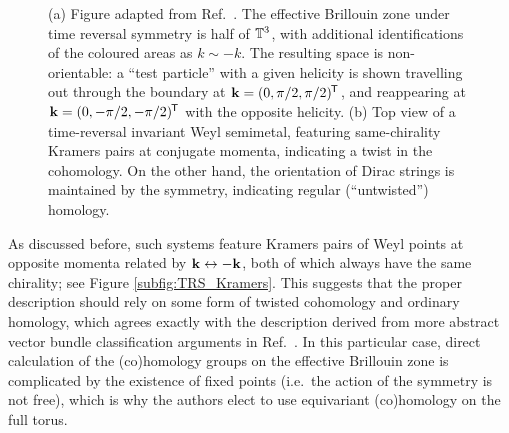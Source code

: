 \begin{figure}[htb!]
	\centering
	\hfil
	\caption{(a) Figure adapted from Ref.\ \cite{Thiang_equivariant}. The effective Brillouin zone under time reversal symmetry is half of $\mathbb{T}^3$, with additional identifications of the coloured areas as $k\sim -k$. The resulting space is non-orientable: a ``test particle'' with a given helicity is shown travelling out through the boundary at $\vb{k} = (0,\pi/2,\pi/2)^{\mkern-1.5mu\mathsf{T}}$, and reappearing at $\vb{k} = (0,-\pi/2,-\pi/2)^{\mkern-1.5mu\mathsf{T}}$ with the opposite helicity. (b) Top view of a time-reversal invariant Weyl semimetal, featuring same-chirality Kramers pairs at conjugate momenta, indicating a twist in the cohomology. On the other hand, the orientation of Dirac strings is maintained by the symmetry, indicating regular (``untwisted'') homology.}
	\label{fig:TRS_twist}
\end{figure}
As discussed before, such systems feature Kramers pairs of Weyl points at opposite momenta related by $\vb{k}\leftrightarrow -\vb{k}$, both of which always have the same chirality; see Figure \ref{subfig:TRS_Kramers}. This suggests that the proper description should rely on some form of twisted cohomology and ordinary homology, which agrees exactly with the description derived from more abstract vector bundle classification arguments in Ref.\ \cite{Thiang_equivariant}. In this particular case, direct calculation of the (co)homology groups on the effective Brillouin zone is complicated by the existence of fixed points (i.e.\ the action of the symmetry is not free), which is why the authors elect to use equivariant (co)homology on the full torus.

